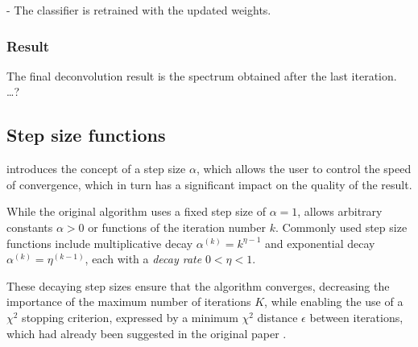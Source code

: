 - The classifier is retrained with the updated weights.

\subsubsection{Result}
The final deconvolution result is the spectrum obtained after the last iteration.
…?


\subsection{Step size functions} \label{sec:dsea:dsea:stepsize}
\dseaplus{} introduces the concept of a step size $\alpha$,
which allows the user to control the speed of convergence,
which in turn has a significant impact on the quality of the result.

While the original \dsea{} algorithm uses a fixed step size of $\alpha = 1$,
\dseaplus{} allows arbitrary constants $\alpha > 0$
or functions of the iteration number $k$.
Commonly used step size functions include
multiplicative decay
  $\alpha^{(k)} = k^{\eta - 1}$
and exponential decay
  $\alpha^{(k)} = \eta^{(k - 1)}$,
each with a \emph{decay rate} $0 < \eta < 1$.

These decaying step sizes ensure that the algorithm converges,
decreasing the importance of the maximum number of iterations $K$,
while enabling the use of a $\chi^2$ stopping criterion,
  expressed by a minimum $\chi^2$ distance $\epsilon$ between iterations,
  which had already been suggested in the original \dsea{} paper \cite{dsea_tim}.


